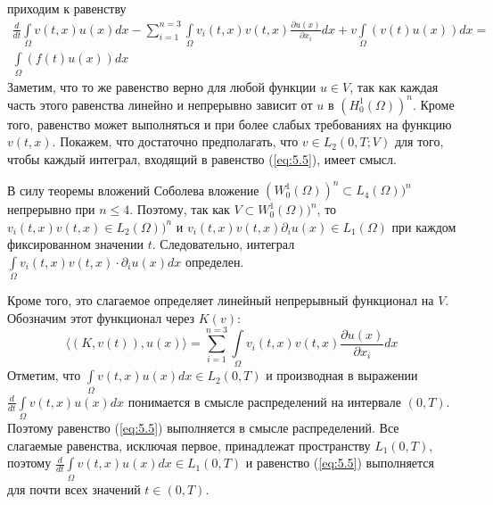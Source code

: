 приходим к равенству
\begin{equation}\label{eq:5.5}
    \begin{gathered}
        \frac{d}{dt}\int\limits_\Omega v(t,x)u(x)dx-\sum_{i=1}^{n=3}\int\limits_\Omega v_i(t,x)v(t,x)\frac{\partial u(x)}{\partial x_i}dx+v\int\limits_\Omega(v(t)u(x))dx= \\
        \int\limits_\Omega(f(t)u(x))dx
    \end{gathered}
\end{equation}
Заметим, что то же равенство верно для любой функции $u\in V$, так как каждая часть этого равенства линейно и непрерывно зависит от
$u$ в $(H^{1}_{0}(\Omega))^n$. Кроме того, равенство может выполняться и при более слабых требованиях на функцию $v(t,x)$.
Покажем, что достаточно предполагать, что $v\in L_2(0,T;V)$ для того, чтобы каждый интеграл, входящий в равенство (\ref{eq:5.5}), имеет смысл.

В силу теоремы вложений Соболева вложение $(W^{1}_{0}(\Omega))^n\subset L_4(\Omega))^n$ непрерывно при $n\leqslant4$.
Поэтому, так как $V\subset W^{1}_{0}(\Omega))^n$, то $v_i(t,x)v(t,x)\in L_2(\Omega))^n$ и $v_i(t,x)v(t,x)\partial_iu(x)\in L_1(\Omega)$
при каждом фиксированном значении $t$. Следовательно, интеграл $\int\limits_\Omega v_i(t,x)v(t,x)\cdot\partial_iu(x)dx$ определен.

Кроме того, это слагаемое определяет линейный непрерывный функционал на $V$. Обозначим этот функционал через $K(v)$:
$$ \langle (K,v(t)),u(x) \rangle =\sum_{i=1}^{n=3}\int\limits_\Omega v_i(t,x)v(t,x)\frac{\partial u(x)}{\partial x_i}dx$$
Отметим, что $\int\limits_\Omega v(t,x)u(x)dx\in L_2(0,T)$ и производная в выражении \linebreak
$\frac{d}{dt}\int\limits_\Omega v(t,x)u(x)dx$
понимается в смысле распределений на интервале $(0,T)$. Поэтому равенство (\ref{eq:5.5}) выполняется в смысле распределений.
Все слагаемые равенства, исключая первое, принадлежат пространству $L_1(0,T)$, поэтому $\frac{d}{dt}\int\limits_\Omega v(t,x)u(x)dx\in L_1(0,T)$
и равенство (\ref{eq:5.5}) выполняется для почти всех значений $t\in (0,T)$.

